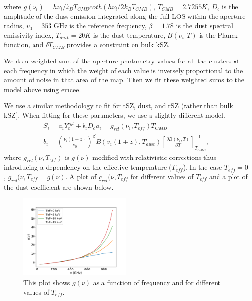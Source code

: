 \documentclass{princeton_astro_thesis}
\begin{document}
where $g(\nu_i)=h\nu_i/k_B T_{CMB} coth(h\nu_i/2k_B T_{CMB})$, $T_{CMB}=2.7255 K$, $D_c$ is the amplitude of the dust emission integrated along the full LOS within the aperture radius, $v_0=353$ GHz is the reference frequency, $\beta=1.78$ is the dust spectral emissivity index, $T_{dust}= 20 K$ is the dust temperature, $B(\nu_i,T)$ is the Planck function, and $\delta T_{CMB}$ provides a constraint on bulk kSZ.\par 
We do a weighted sum of the aperture photometry values for all the clusters at each frequency in which the weight of each value is inversely proportional to the amount of noise in that area of the map. Then we fit these weighted sums to the model above using emcee.
\par We use a similar methodology to fit for tSZ, dust, and rSZ (rather than bulk kSZ). When fitting for these parameters, we use a slightly different model.
\begin{equation}
\begin{aligned}
S_i=a_i Y^{cyl}_{c}+b_i D_c %
a_i=g_{rel}(\nu_i,T_{eff}) T_{CMB}\\
b_i=\left(\frac{\nu_i(1+z)}{\nu_0}\right)^\beta B (v_i(1+z),T_{dust})\left[\frac{\partial B(\nu_i,T)}{\partial T} \right]^{-1}_{T_{CMB}},
\end{aligned}
\end{equation}
where $g_{rel}(\nu,T_{eff})$ is $g(\nu)$ modified with relativistic corrections thus introducing a dependency on the effective temperature ($T_{eff}$). In the case $T_{eff}=0$, $g_{rel}(\nu,T_{eff}=g(\nu)$. A plot of $g_{rel}(\nu,T_{eff}$ for different values of $T_{eff}$ and a plot of the dust coefficient are shown below.

\begin{figure}[h]
\centering
\includegraphics[width=0.5\textwidth]{../gnu.pdf}
\caption{This plot shows $g(\nu)$ as a function of frequency and for different values of $T_{eff}$. }
\end{figure}
\end{document}
